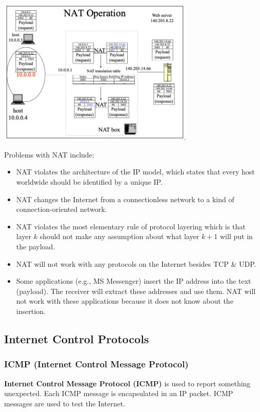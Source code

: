 \documentclass[11pt]{article}
\begin{document}
\begin{center}
    \includegraphics[width=0.7\textwidth]{natoperation.png}
\end{center}

Problems with NAT include:
\begin{itemize}
    \item   NAT violates the architecture of the IP model, which states that every host worldwide should be identified by a unique IP.
    \item   NAT changes the Internet from a connectionless network to a kind of connection-oriented network.
    \item   NAT violates the most elementary rule of protocol layering which is that layer $k$ should not make any assumption about what layer $k+1$ will put in the payload.
    \item   NAT will not work with any protocols on the Internet besides TCP \& UDP.
    \item   Some applications (e.g., MS Messenger) insert the IP address into the text (payload). The receiver will extract these addresses and use them. NAT will not work with these applications because it does not know about 
            the insertion.
\end{itemize}

\subsection{Internet Control Protocols}
\subsubsection{ICMP (Internet Control Message Protocol)}
\textbf{Internet Control Message Protocol (ICMP)} is used to report something unexpected. 
Each ICMP message is encapsulated in an IP packet.
ICMP messages are used to test the Internet.
\end{document}
